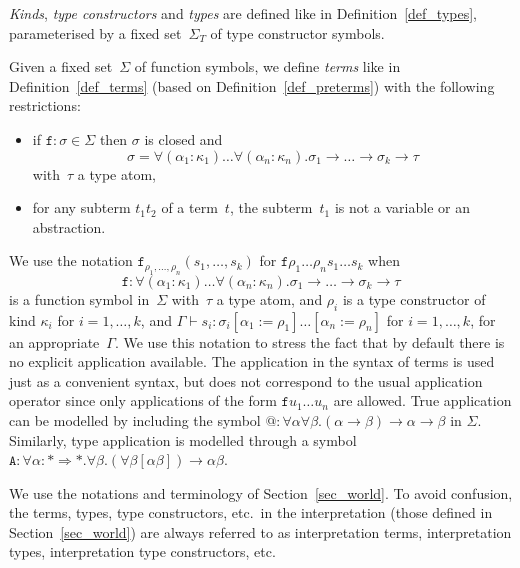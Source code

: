 \documentclass[runningheads,a4paper]{llncs}
\newcommand{\arrtype}{\rightarrow}
\newcommand{\arrkind}{\Rightarrow}
\newcommand{\proves}{\vdash}
\begin{document}
\begin{definition}\normalfont
  \emph{Kinds}, \emph{type constructors} and \emph{types} are defined
  like in Definition~\ref{def_types}, parameterised by a fixed
  set~$\Sigma_T$ of type constructor symbols.

  Given a fixed set~$\Sigma$ of function symbols, we define
  \emph{terms} like in Definition~\ref{def_terms} (based on
  Definition~\ref{def_preterms}) with the following restrictions:
  \begin{itemize}
  \item if $\mathtt{f} : \sigma \in \Sigma$ then $\sigma$ is closed and
    \[
    \sigma = \forall (\alpha_1 : \kappa_1) \ldots \forall (\alpha_n : \kappa_n)
    . \sigma_1 \arrtype \ldots \arrtype \sigma_k \arrtype \tau
    \]
    with~$\tau$ a type atom,
  \item for any subterm $t_1 t_2$ of a term~$t$, the subterm~$t_1$ is
    not a variable or an abstraction.
  \end{itemize}
\end{definition}

We use the notation
$\mathtt{f}_{\rho_1,\ldots,\rho_n}(s_1,\ldots,s_k)$ for
$\mathtt{f} \rho_1 \ldots \rho_n s_1 \ldots s_k$ when
\[
  \mathtt{f} : \forall (\alpha_1 : \kappa_1) \ldots
  \forall (\alpha_n : \kappa_n) . \sigma_1 \arrtype \ldots \arrtype
  \sigma_k \arrtype \tau
\]
is a function symbol in~$\Sigma$ with~$\tau$ a type atom, and $\rho_i$
is a type constructor of kind $\kappa_i$ for $i=1,\ldots,k$, and
$\Gamma \proves s_i : \sigma_i[\alpha_1 := \rho_1]\ldots[\alpha_n :=
  \rho_n]$ for $i=1,\ldots,k$, for an appropriate~$\Gamma$. We use
this notation to stress the fact that by default there is no explicit
application available. The application in the syntax of terms is used
just as a convenient syntax, but does not correspond to the usual
application operator since only applications of the form $\mathtt{f}
u_1 \ldots u_n$ are allowed. True application can be modelled by
including the symbol ${@} : \forall\alpha\forall\beta . (\alpha
\arrtype \beta) \arrtype \alpha \arrtype \beta$ in
$\Sigma$. Similarly, type application is modelled through a symbol
$\mathtt{A} : \forall \alpha : * \arrkind * . \forall \beta . (\forall
\beta [\alpha \beta]) \arrtype \alpha \beta$.

We use the notations and terminology of Section~\ref{sec_world}. To
avoid confusion, the terms, types, type constructors, etc.~in the
interpretation (those defined in Section~\ref{sec_world}) are always
referred to as interpretation terms, interpretation types,
interpretation type constructors, etc.
\end{document}
